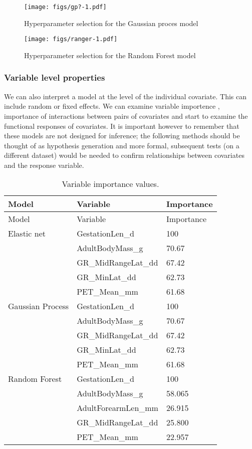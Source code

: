 \documentclass[10pt,]{article}
\begin{document}
\begin{figure}[htbp]
\centering
\texttt{[image: figs/gp?-1.pdf]}
\caption{Hyperparameter selection for the Gaussian proces model\protect\label{fig:gphyp}}
\end{figure}

\begin{figure}[htbp]
\centering
\texttt{[image: figs/ranger-1.pdf]}
\caption{Hyperparameter selection for the Random Forest model\protect\label{fig:rfhyp}}
\end{figure}

\subsubsection{Variable level properties}\label{variable-level-properties}

We can also interpret a model at the level of the individual covariate. This can include random or fixed effects. We can examine variable importence \citep{oppel2009alternative}, importance of interactions between pairs of covariates and start to examine the functional responses of covariates. It is important however to remember that these models are not designed for inference; the following methods should be thought of as hypothesis generation and more formal, subsequent tests (on a different dataset) would be needed to confirm relationships between covariates and the response variable.

\begin{longtable}[c]{@{}lll@{}}
\caption{Variable importance values. \label{tbl:varimp}}\tabularnewline
\toprule
Model & Variable & Importance\tabularnewline
\midrule
\endfirsthead
\toprule
Model & Variable & Importance\tabularnewline
\midrule
\endhead
Elastic net & GestationLen\_d & 100\tabularnewline
& AdultBodyMass\_g & 70.67\tabularnewline
& GR\_MidRangeLat\_dd & 67.42\tabularnewline
& GR\_MinLat\_dd & 62.73\tabularnewline
& PET\_Mean\_mm & 61.68\tabularnewline
Gaussian Process & GestationLen\_d & 100\tabularnewline
& AdultBodyMass\_g & 70.67\tabularnewline
& GR\_MidRangeLat\_dd & 67.42\tabularnewline
& GR\_MinLat\_dd & 62.73\tabularnewline
& PET\_Mean\_mm & 61.68\tabularnewline
Random Forest & GestationLen\_d & 100\tabularnewline
& AdultBodyMass\_g & 58.065\tabularnewline
& AdultForearmLen\_mm & 26.915\tabularnewline
& GR\_MidRangeLat\_dd & 25.800\tabularnewline
& PET\_Mean\_mm & 22.957\tabularnewline
\bottomrule
\end{longtable}
\end{document}
